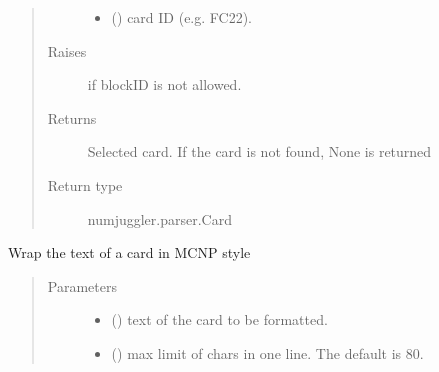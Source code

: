 \documentclass[letterpaper,10pt,english]{sphinxmanual}
\begin{document}
\begin{fulllineitems}
\begin{fulllineitems}
\begin{quote}
\begin{description}
\begin{itemize}
\item {} 
\sphinxAtStartPar
{} () \textendash{} card ID (e.g. FC22).

\end{itemize}

\item[{Raises}] \leavevmode
\sphinxAtStartPar
{} \textendash{} if blockID is not allowed.

\item[{Returns}] \leavevmode
\sphinxAtStartPar
{} \textendash{} Selected card. If the card is not found, None is returned

\item[{Return type}] \leavevmode
\sphinxAtStartPar
numjuggler.parser.Card

\end{description}\end{quote}

\end{fulllineitems}


\begin{fulllineitems}
\label{\detokenize{api/inputgeneration:inputfile.InputFile.mcnp_wrap}}
\sphinxAtStartPar
Wrap the text of a card in MCNP style
\begin{quote}\begin{description}
\item[{Parameters}] \leavevmode\begin{itemize}
\item {} 
\sphinxAtStartPar
{} () \textendash{} text of the card to be formatted.

\item {} 
\sphinxAtStartPar
{} (\sphinxstyleliteralemphasis{\sphinxupquote{, }}) \textendash{} max limit of chars in one line. The default is 80.


\end{itemize}
\end{description}
\end{quote}
\end{fulllineitems}
\end{fulllineitems}
\end{document}
